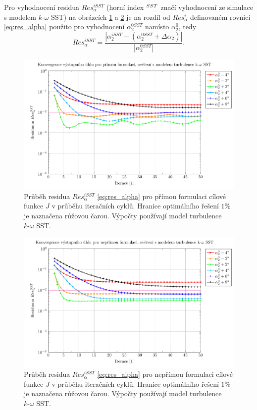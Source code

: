 Pro vyhodnocení residua $ Res_\alpha^{iSST} $ (horní index $ \null^{SST} $ značí vyhodnocení ze simulace s modelem $k\text{-}\omega$ SST) na obrázcích \ref{fig:ghs1_UyAKO} a \ref{fig:ghs1_FyAKO} je na rozdíl od $ Res_\alpha^i $ definovaném rovnicí \ref{eq:res_alpha} použito pro vyhodnocení $ \alpha_{2}^{0SST} $ namísto $ \alpha_{2}^{0} $, tedy
\begin{equation}\label{eq:res_alphaSST}
Res_\alpha^{iSST} = \dfrac{| \alpha_{2}^{iSST}-( \alpha_{2}^{0SST}+\Delta\alpha_2 ) |} {|\alpha_{2}^{0SST}|}.
\end{equation}
\begin{figure}[H]
	\centering
	\includegraphics[width=1\textwidth]{img/UyAKO.pdf}
	\caption[ Průběh residua $ Res_{\alpha}^{iSST} $, přímá formulace, $k\text{-}\omega$ SST ]{Průběh residua $ Res_{\alpha}^{iSST} $ \ref{eq:res_alpha} pro přímou formulaci cílové funkce $ J $ v průběhu iteračních cyklů. Hranice optimálního řešení $ 1\% $ je naznačena růžovou čarou. Výpočty používají model turbulence $k\text{-}\omega$ SST.}
	\label{fig:ghs1_UyAKO}
\end{figure}
\begin{figure}[H]
	\centering
	\includegraphics[width=1\textwidth]{img/FyAKO.pdf}
	\caption[ Průběh residua $ Res_{\alpha}^{iSST} $, nepřímá formulace, $k\text{-}\omega$ SST ]{Průběh residua $ Res_{\alpha}^{iSST} $ \ref{eq:res_alpha} pro nepřímou formulaci cílové funkce $ J $ v průběhu iteračních cyklů. Hranice optimálního řešení $ 1\% $ je naznačena růžovou čarou. Výpočty používají model turbulence $k\text{-}\omega$ SST.}
	\label{fig:ghs1_FyAKO}
\end{figure}
